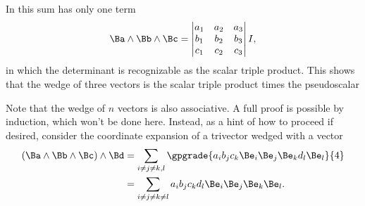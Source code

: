 In  this sum has only one term
\begin{equation}\label{eqn:generalizedWedge:680}
\Ba \wedge \Bb \wedge \Bc
=
\begin{vmatrix}
a_1 & a_2 & a_3 \\
b_1 & b_2 & b_3 \\
c_1 & c_2 & c_3 \\
\end{vmatrix}
I,
\end{equation}
in which the determinant is recognizable as the scalar triple product.  This shows that the  wedge of three vectors is the scalar triple product times the pseudoscalar


Note that the wedge of \( n \) vectors is also associative.
A full proof is possible by induction, which won't be done here.
Instead, as a hint of how to proceed if desired,
consider the coordinate expansion of a trivector wedged with a vector
\begin{equation}\label{eqn:generalizedWedge:660}
\begin{aligned}
(\Ba \wedge \Bb \wedge \Bc) \wedge \Bd
&=
\sum_{i \ne j \ne k, l}
\gpgrade{
a_i b_j c_k
\Be_i \Be_j \Be_k
d_l \Be_l
}{4} \\
&=
\sum_{i \ne j \ne k \ne l}
a_i b_j c_k d_l
\Be_i \Be_j \Be_k \Be_l.
\end{aligned}
\end{equation}

